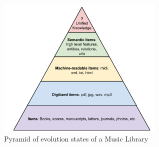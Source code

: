 \begin{figure}[!ht]
	\centering
	\includegraphics[width=8cm]{ch05_musicology_pics/evolution-dl.jpg}
	\caption{Pyramid of evolution states of a Music Library
	\label{fig:musicology:pyramid}}
\end{figure}




